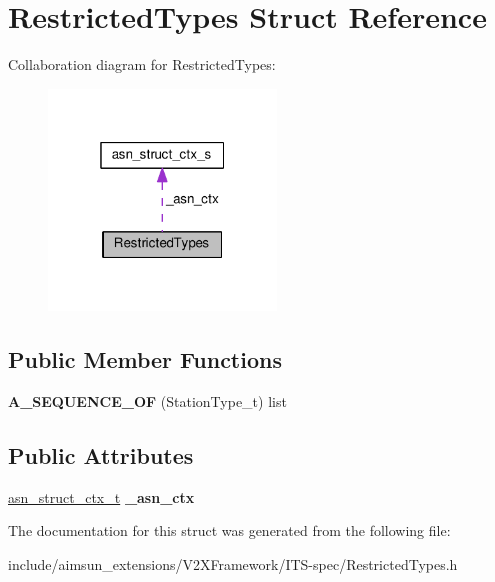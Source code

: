 \hypertarget{structRestrictedTypes}{}\section{Restricted\+Types Struct Reference}
\label{structRestrictedTypes}


Collaboration diagram for Restricted\+Types\+:\nopagebreak
\begin{figure}[H]
\begin{center}
\leavevmode
\includegraphics[width=172pt]{structRestrictedTypes__coll__graph}
\end{center}
\end{figure}
\subsection*{Public Member Functions}
\begin{DoxyCompactItemize}
\item 
{\bfseries A\+\_\+\+S\+E\+Q\+U\+E\+N\+C\+E\+\_\+\+OF} (Station\+Type\+\_\+t) list\hypertarget{structRestrictedTypes_a6b52a2b2339e4e362f3dfed6a95319b6}{}\label{structRestrictedTypes_a6b52a2b2339e4e362f3dfed6a95319b6}

\end{DoxyCompactItemize}
\subsection*{Public Attributes}
\begin{DoxyCompactItemize}
\item 
\hyperlink{structasn__struct__ctx__s}{asn\+\_\+struct\+\_\+ctx\+\_\+t} {\bfseries \+\_\+asn\+\_\+ctx}\hypertarget{structRestrictedTypes_a4b6e34b88548e2e50514af4b0dd11b00}{}\label{structRestrictedTypes_a4b6e34b88548e2e50514af4b0dd11b00}

\end{DoxyCompactItemize}


The documentation for this struct was generated from the following file\+:\begin{DoxyCompactItemize}
\item 
include/aimsun\+\_\+extensions/\+V2\+X\+Framework/\+I\+T\+S-\/spec/Restricted\+Types.\+h\end{DoxyCompactItemize}
